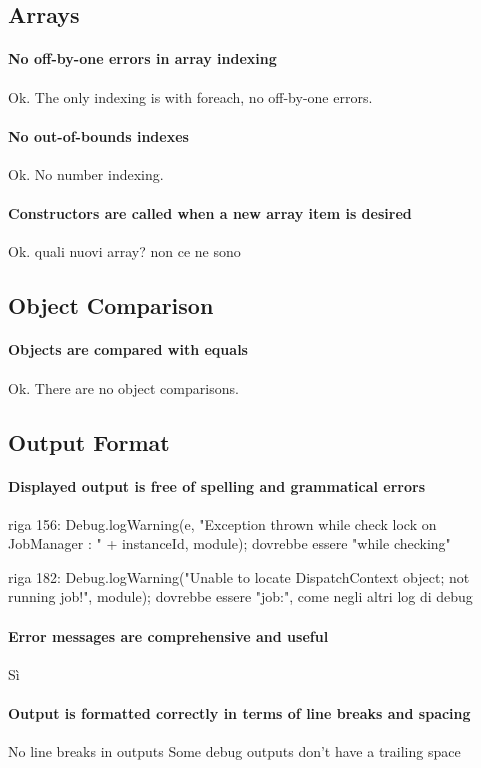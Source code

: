 \documentclass[english]{article}
\begin{document}
\subsection{Arrays}
\paragraph{No off-by-one errors in array indexing}
Ok.
The only indexing is with foreach, no off-by-one errors.

\paragraph{No out-of-bounds indexes}
Ok.
No number indexing.

\paragraph{Constructors are called when a new array item is desired}
Ok.
quali nuovi array? non ce ne sono

\subsection{Object Comparison}
\paragraph{Objects are compared with equals}
Ok.
There are no object comparisons.

\subsection{Output Format}
\paragraph{Displayed output is free of spelling and grammatical errors}
riga 156:
Debug.logWarning(e, "Exception thrown while check lock on JobManager : " + instanceId, module);
dovrebbe essere "while checking"

riga 182:
Debug.logWarning("Unable to locate DispatchContext object; not running job!", module);
dovrebbe essere "job:", come negli altri log di debug

\paragraph{Error messages are comprehensive and useful}
Sì

\paragraph{Output is formatted correctly in terms of line breaks and spacing}
No line breaks in outputs
Some debug outputs don't have a trailing space ~
\end{document}
